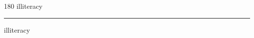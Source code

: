 
\begin{frame}
\begin{center}
\begin{turn}{180}
{\fontsize{2.5cm}{1em}\selectfont illiteracy}
\end{turn}
\vspace{1em}\par  
\hrule
\vspace{1em}\par  
{\fontsize{2.5cm}{1em}\selectfont illiteracy}
\end{center}
\end{frame}
